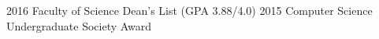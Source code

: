   \begin{cvskills} 
    	\cvskill
		{2016}
		{Faculty of Science Dean's List (GPA 3.88/4.0)}
	\cvskill
		{2015}
		{Computer Science Undergraduate Society Award}
  \end{cvskills}
